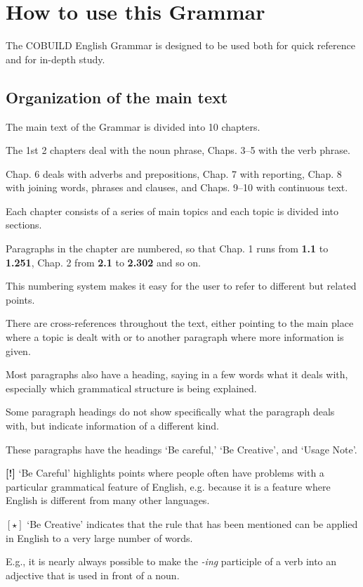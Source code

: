 \documentclass[oneside]{book}
\numberwithin{equation}{section}
\begin{document}
\section{How to use this Grammar}
The COBUILD English Grammar is designed to be used both for quick reference and for in-depth study.

\subsection{Organization of the main text}
The main text of the Grammar is divided into 10 chapters.

The 1st 2 chapters deal with the noun phrase, Chaps. 3--5 with the verb phrase.

Chap. 6 deals with adverbs and prepositions, Chap. 7 with reporting, Chap. 8 with joining words, phrases and clauses, and Chaps. 9--10 with continuous text.

%
Each chapter consists of a series of main topics and each topic is divided into sections.

Paragraphs in the chapter are numbered, so that Chap. 1 runs from \textbf{1.1} to \textbf{1.251}, Chap. 2 from \textbf{2.1} to \textbf{2.302} and so on.

This numbering system makes it easy for the user to refer to different but related points.

There are cross-references throughout the text, either pointing to the main place where a topic is dealt with or to another paragraph where more information is given.

%
Most paragraphs also have a heading, saying in a few words what it deals with, especially which grammatical structure is being explained.

Some paragraph headings do not show specifically what the paragraph deals with, but indicate information of a different kind.

These paragraphs have the headings `Be careful,' `Be Creative', and `Usage Note'.

%
\textbf{[!]} `Be Careful' highlights points where people often have problems with a particular grammatical feature of English, e.g. because it is a feature where English is different from many other languages.

%
$[\star]$ `Be Creative' indicates that the rule that has been mentioned can be applied in English to a very large number of words.

E.g., it is nearly always possible to make the \textit{-ing} participle of a verb into an adjective that is used in front of a noun.
\end{document}

